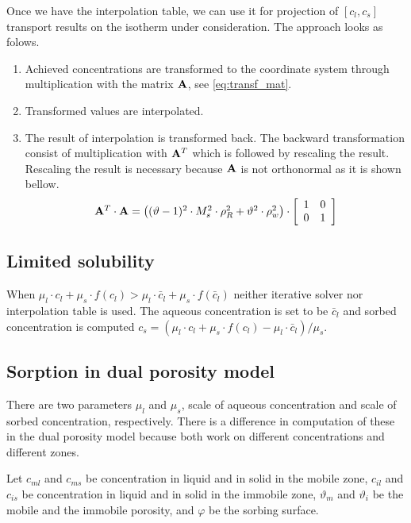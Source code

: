 Once we have the interpolation table, we can use it for projection of ${[c_l,c_s]}$ transport results on the 
isotherm under consideration. The approach looks as folows.
\begin{enumerate}
 \item Achieved concentrations are transformed to the coordinate system through multiplication with the 
       matrix ${\bf A}$, see \eqref{eq:transf_mat}.
 \item Transformed values are interpolated.
 \item The result of interpolation is transformed back. The backward transformation consist of multiplication 
       with ${\bf A}^T$ which is followed by rescaling the result. Rescaling the result is necessary because  
       ${\bf A}$ is not orthonormal as it is shown bellow.
 \[
 \begin{array}{l}
 {\bf A}^T\cdot{\bf A} =
  \left((\vartheta - 1)^2\cdot M_s^2\cdot \rho_R^2 + \vartheta^2\cdot \rho_w^2\right)\cdot\left[\begin{array}{cc}
    1 & 0\\
    0 & 1
  \end{array}\right]
  \end{array}
 \]
\end{enumerate}


\subsection{Limited solubility}\label{subsec:lim_solub}
When $\mu_l\cdot c_l + \mu_s\cdot f(c_l) > \mu_l\cdot \bar{c}_l + \mu_s\cdot f(\bar{c}_l)$ neither iterative 
solver nor interpolation table is used. The aqueous concentration is set to be $\bar{c}_l$ and sorbed 
concentration is computed $c_s = (\mu_l\cdot c_l + \mu_s\cdot f(c_l) - \mu_l\cdot \bar{c}_l)/\mu_s$.

\subsection{Sorption in dual porosity model} 
\label{subsec:sorp_dual_por}
There are two parameters $\mu_l$ and $\mu_s$, scale of aqueous concentration and scale of sorbed concentration, respectively.  
There is a difference in computation of these in the dual porosity model because both work on different concentrations
and different zones.

Let $c_{ml}$ and $c_{ms}$ be concentration in liquid and in solid in the mobile zone, 
$c_{il}$ and $c_{is}$ be concentration in liquid and in solid in the immobile zone,
$\vartheta_m$ and $\vartheta_i$ be the mobile and the immobile porosity,
and $\varphi$ be the sorbing surface.

